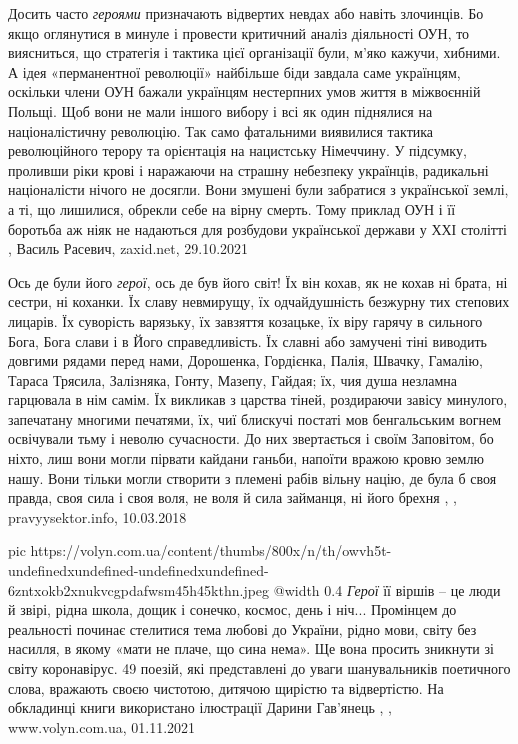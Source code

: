 Досить часто \emph{героями} призначають відвертих невдах або навіть злочинців. Бо якщо
оглянутися в минуле і провести критичний аналіз діяльності ОУН, то виясниться,
що стратегія і тактика цієї організації були, м’яко кажучи, хибними. А ідея
«перманентної революції» найбільше біди завдала саме українцям, оскільки члени
ОУН бажали українцям нестерпних умов життя в міжвоєнній Польщі. Щоб вони не
мали іншого вибору і всі як один піднялися на націоналістичну революцію. Так
само фатальними виявилися тактика революційного терору та орієнтація на
нацистську Німеччину. У підсумку, проливши ріки крові і наражаючи на страшну
небезпеку українців, радикальні націоналісти нічого не досягли. Вони змушені
були забратися з української землі, а ті, що лишилися, обрекли себе на вірну
смерть. Тому приклад ОУН і її боротьба аж ніяк не надаються для розбудови
української держави у ХХІ столітті
, 
Василь Расевич, zaxid.net, 29.10.2021

Ось де були його \emph{герої}, ось де був його світ! Їх він кохав, як не кохав
ні брата, ні сестри, ні коханки. Їх славу невмирущу, їх одчайдушність безжурну
тих степових лицарів. Їх суворість варязьку, їх завзяття козацьке, їх віру
гарячу в сильного Бога, Бога слави і в Його справедливість. Їх славні або
замучені тіні виводить довгими рядами перед нами, Дорошенка, Гордієнка, Палія,
Швачку, Гамалію, Тараса Трясила, Залізняка, Гонту, Мазепу, Гайдая; їх, чия душа
незламна гарцювала в нім самім. Їх викликав з царства тіней, роздираючи завісу
минулого, запечатану многими печатями, їх, чиї блискучі постаті мов
бенгальським вогнем освічували тьму і неволю сучасности. До них звертається і
своїм Заповітом, бо ніхто, лиш вони могли пірвати кайдани ганьби, напоїти
вражою кровю землю нашу. Вони тільки могли створити з племені рабів вільну
націю, де була б своя правда, своя сила і своя воля, не воля й сила займанця,
ні його брехня
, , pravyysektor.info, 10.03.2018

\ifcmt
  pic https://volyn.com.ua/content/thumbs/800x/n/th/owvh5t-undefinedxundefined-undefinedxundefined-6zntxokb2xnukvcgpdafwsm45h45kthn.jpeg
  @width 0.4
\fi
\emph{Герої} її віршів – це люди й звірі, рідна школа, дощик і сонечко, космос, день і
ніч... Промінцем до реальності починає стелитися тема любові до України, рідно
мови, світу без насилля, в якому «мати не плаче, що сина нема». Ще вона просить
зникнути зі світу коронавірус. 49 поезій, які представлені до уваги
шанувальників поетичного слова, вражають своєю чистотою, дитячою щирістю та
відвертістю. На обкладинці книги використано ілюстрації Дарини Гав’янець
, , www.volyn.com.ua, 01.11.2021

